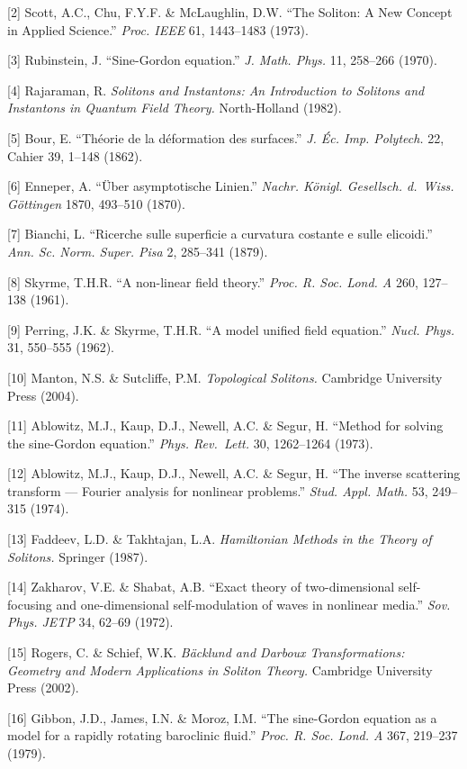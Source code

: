 \documentclass[a4paper,11pt]{article}
\begin{document}
{[}2{]} Scott, A.C., Chu, F.Y.F. \& McLaughlin, D.W. ``The Soliton: A
New Concept in Applied Science.'' \emph{Proc. IEEE} 61, 1443--1483
(1973).

{[}3{]} Rubinstein, J. ``Sine-Gordon equation.'' \emph{J. Math. Phys.}
11, 258--266 (1970).

{[}4{]} Rajaraman, R. \emph{Solitons and Instantons: An Introduction to
Solitons and Instantons in Quantum Field Theory.} North-Holland (1982).

{[}5{]} Bour, E. ``Théorie de la déformation des surfaces.'' \emph{J.
Éc. Imp. Polytech.} 22, Cahier 39, 1--148 (1862).

{[}6{]} Enneper, A. ``Über asymptotische Linien.'' \emph{Nachr. Königl.
Gesellsch. d.~Wiss. Göttingen} 1870, 493--510 (1870).

{[}7{]} Bianchi, L. ``Ricerche sulle superficie a curvatura costante e
sulle elicoidi.'' \emph{Ann. Sc. Norm. Super. Pisa} 2, 285--341 (1879).

{[}8{]} Skyrme, T.H.R. ``A non-linear field theory.'' \emph{Proc. R.
Soc. Lond. A} 260, 127--138 (1961).

{[}9{]} Perring, J.K. \& Skyrme, T.H.R. ``A model unified field
equation.'' \emph{Nucl. Phys.} 31, 550--555 (1962).

{[}10{]} Manton, N.S. \& Sutcliffe, P.M. \emph{Topological Solitons.}
Cambridge University Press (2004).

{[}11{]} Ablowitz, M.J., Kaup, D.J., Newell, A.C. \& Segur, H. ``Method
for solving the sine-Gordon equation.'' \emph{Phys. Rev.~Lett.} 30,
1262--1264 (1973).

{[}12{]} Ablowitz, M.J., Kaup, D.J., Newell, A.C. \& Segur, H. ``The
inverse scattering transform --- Fourier analysis for nonlinear
problems.'' \emph{Stud. Appl. Math.} 53, 249--315 (1974).

{[}13{]} Faddeev, L.D. \& Takhtajan, L.A. \emph{Hamiltonian Methods in
the Theory of Solitons.} Springer (1987).

{[}14{]} Zakharov, V.E. \& Shabat, A.B. ``Exact theory of
two-dimensional self-focusing and one-dimensional self-modulation of
waves in nonlinear media.'' \emph{Sov. Phys. JETP} 34, 62--69 (1972).

{[}15{]} Rogers, C. \& Schief, W.K. \emph{Bäcklund and Darboux
Transformations: Geometry and Modern Applications in Soliton Theory.}
Cambridge University Press (2002).

{[}16{]} Gibbon, J.D., James, I.N. \& Moroz, I.M. ``The sine-Gordon
equation as a model for a rapidly rotating baroclinic fluid.''
\emph{Proc. R. Soc. Lond. A} 367, 219--237 (1979).
\end{document}
